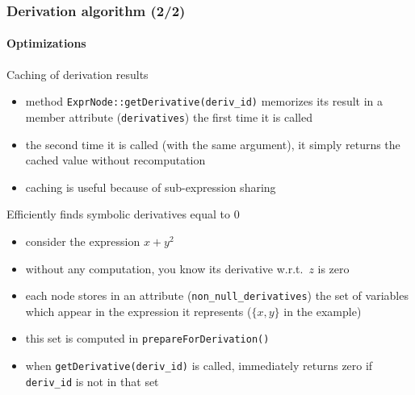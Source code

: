 \documentclass[aspectratio=169]{beamer}
\newenvironment{witemize}{\itemize\addtolength{\itemsep}{8pt}}{\enditemize}
\begin{document}
\begin{frame}
  \frametitle{Derivation algorithm (2/2)}
  \framesubtitle{Optimizations}
  \begin{witemize}
  \item Caching of derivation results
    \begin{itemize}
    \item method \texttt{ExprNode::getDerivative(deriv\_id)} memorizes its result in a member attribute (\texttt{derivatives}) the first time it is called
    \item the second time it is called (with the same argument), it simply returns the cached value without recomputation
    \item caching is useful because of sub-expression sharing
    \end{itemize}
  \item Efficiently finds symbolic derivatives equal to $0$
    \begin{itemize}
    \item consider the expression $x+y^2$
    \item without any computation, you know its derivative w.r.t.\ $z$ is zero
    \item each node stores in an attribute (\texttt{non\_null\_derivatives}) the set of variables which appear in the expression it represents ($\{x,y\}$ in the example)
    \item this set is computed in \texttt{prepareForDerivation()}
    \item when \texttt{getDerivative(deriv\_id)} is called, immediately returns zero if \texttt{deriv\_id} is not in that set
    \end{itemize}
  \end{witemize}
\end{frame}
\end{document}
